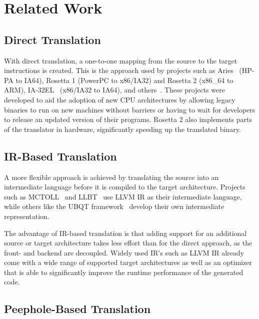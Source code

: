 
\chapter{Related Work}\label{ch:related-work}

\section{Direct Translation}\label{sec:direct-translation}

With direct translation, a one-to-one mapping from the source to the target instructions is created.
This is the approach used by projects such as Aries~\parencite{aries} (HP-PA to IA64), Rosetta 1 (PowerPC to x86/IA32) and Rosetta 2 (x86\_64 to ARM), IA-32EL~\parencite{ia32el} (x86/IA32 to IA64), and others~\parencite{arm-sbt}.
These projects were developed to aid the adoption of new CPU architectures by allowing legacy binaries to run on new machines without barriers or having to wait for developers to release an updated version of their programs.
Rosetta 2 also implements parts of the translator in hardware, significantly speeding up the translated binary.

\section{IR-Based Translation}\label{sec:llvm-based-translation}

A more flexible approach is achieved by translating the source into an intermediate language before it is compiled to the target architecture.
Projects such as MCTOLL~\parencite{yadavalli_raising_2019} and LLBT~\parencite{llbt} use LLVM IR as their intermediate language, while others like the UBQT framework~\parencite{10.5555/1698151} develop their own intermediate representation.

The advantage of IR-based translation is that adding support for an additional source or target architecture takes less effort than for the direct approach, as the front- and backend are decoupled.
Widely used IR's such as LLVM IR already come with a wide range of supported target architectures as well as an optimizer that is able to significantly improve the runtime performance of the generated code.

\section{Peephole-Based Translation}\label{sec:peephole-based-translation}

